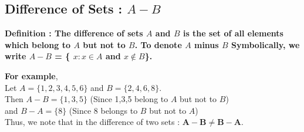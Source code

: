 \documentclass[12pt, letterpaper]{article}
\begin{document}
\subsection{Difference of Sets : $A-B$}
\begin{displayquote}
\textbf{Definition : The difference of sets $A$ and $B$ is the set of all elements which belong to $A$ but not to $B$. To denote $A$ minus $B$ Symbolically, we write $A - B$ = \{ $x : x \in A$ and $x \notin B$\}.}
\end{displayquote}

\textbf{For example},\\ 
Let $A = \{1,2,3,4,5,6\}$ and $B = \{2,4,6,8\}$.\\
Then $A-B = \{1,3,5\}$ (Since 1,3,5 belong to $A$ but not to $B$)\\
and $B-A = \{8\}$ (Since 8 belongs to $B$ but not to $A$)\\
Thus, we note that in the difference of two sets : $\mathbf{A-B \neq B-A}$.
\end{document}
